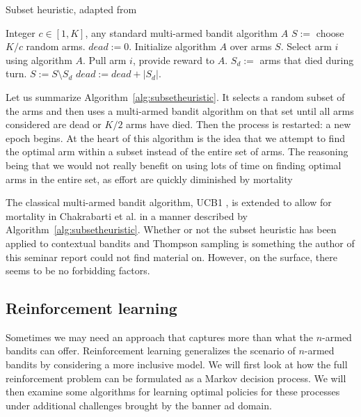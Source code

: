 \documentclass{article} %
\begin{document}
\begin{algorithm}
  \caption{Subset heuristic, adapted from \cite{chakrabarti2008mortal}}
  \label{alg:subsetheuristic}
  \begin{algorithmic}[1]
    \Require Integer $c \in [1,K]$, any standard multi-armed bandit algorithm
    $A$
      \State $S := $ choose $K/c$ random arms.
      \State $dead := 0$.
      \State Initialize algorithm $A$ over arms $S$.
      \Repeat
        \State Select arm $i$ using algorithm $A$.
        \State Pull arm $i$, provide reward to $A$.
        \State $S_d :=$ arms that died during turn.
        \State $S := S \setminus S_d$
        \State $dead := dead + |S_d|$.
    \EndFor
  \end{algorithmic}
\end{algorithm}

Let us summarize Algorithm~\ref{alg:subsetheuristic}. It selects a random
subset of the arms and then uses a multi-armed bandit algorithm on that set
until all arms considered are dead or $K/2$ arms have died. Then the process is
restarted: a new epoch begins. At the heart of this algorithm is the idea that
we attempt to find the optimal arm within a subset instead of the entire set of
arms. The reasoning being that we would not really benefit on using lots of
time on finding optimal arms in the entire set, as effort are quickly
diminished by mortality

The classical multi-armed bandit algorithm, UCB1 \cite{auer2002finite}, is
extended to allow for mortality in Chakrabarti et al.
\cite{chakrabarti2008mortal} in a manner described by
Algorithm~\ref{alg:subsetheuristic}. Whether or not the subset heuristic has
been applied to contextual bandits and Thompson sampling is something the
author of this seminar report could not find material on. However, on the
surface, there seems to be no forbidding factors.


\subsection{Reinforcement learning}

Sometimes we may need an approach that captures more than what the $n$-armed
bandits can offer. Reinforcement learning generalizes the scenario of $n$-armed
bandits by considering a more inclusive model. We will first look at how the
full reinforcement problem can be formulated as a Markov decision process. We
will then examine some algorithms for learning optimal policies for these
processes under additional challenges brought by the banner ad domain.
\end{document}
